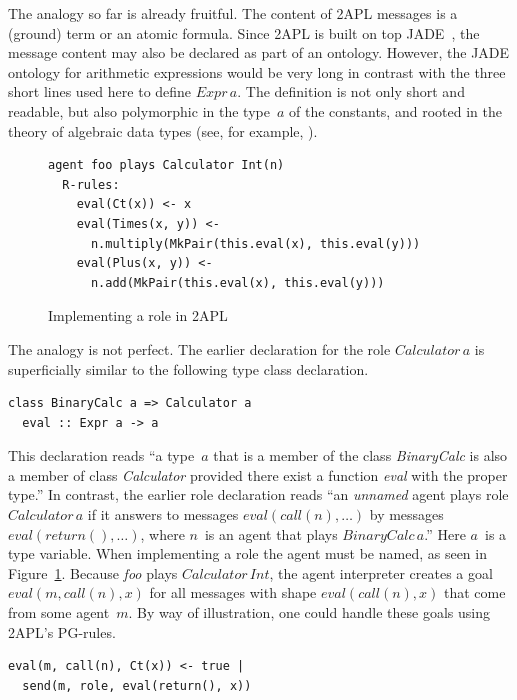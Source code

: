 \documentclass[a4paper,12pt,oneside,fleqn]{book} %
\begin{document}
The analogy so far is already fruitful. The content of 2APL messages is a
(ground) term or an atomic formula. Since 2APL is built on top
JADE~\cite{DBLP:books/sp/map2005/BellifemineBCP05}, the message content may
also be declared as part of an ontology. However, the JADE ontology for
arithmetic expressions would be very long in contrast with the three short
lines used here to define $\mathit{Expr}\,a$. The definition is not only
short and readable, but also polymorphic in the type~$a$ of the constants,
and rooted in the theory of algebraic data types (see, for example,
\cite{DBLP:conf/ctcs/Hagino87}).

\begin{figure}\footnotesize %
\begin{verbatim}
agent foo plays Calculator Int(n)
  R-rules:
    eval(Ct(x)) <- x
    eval(Times(x, y)) <-
      n.multiply(MkPair(this.eval(x), this.eval(y)))
    eval(Plus(x, y)) <-
      n.add(MkPair(this.eval(x), this.eval(y)))
\end{verbatim}
\caption{Implementing a role in 2APL}\label{fig:roleimpl2APL}
\end{figure} %

The analogy is not perfect. The earlier declaration for the role
$\mathit{Calculator}\,a$ is superficially similar to the following type
class declaration.
\begin{verbatim}
class BinaryCalc a => Calculator a
  eval :: Expr a -> a
\end{verbatim}

This declaration reads ``a type~$a$ that is a member of the class
\textit{BinaryCalc} is also a member of class \textit{Calculator} provided
there exist a function \textit{eval} with the proper type.'' In contrast,
the earlier role declaration reads ``an \emph{unnamed} agent plays role
$\mathit{Calculator}\,a$ if it answers to messages
$\mathit{eval}(\mathit{call}(n),\ldots)$ by messages
$\mathit{eval}(\mathit{return}(),\ldots)$, where $n$~is an agent that plays
$\mathit{BinaryCalc}\,a$.'' Here $a$~is a type variable.  When implementing
a role the agent must be named, as seen in Figure~\ref{fig:roleimpl2APL}.
Because \textit{foo} plays $\mathit{Calculator}\,\mathit{Int}$, the agent
interpreter creates a goal $\mathit{eval}(m,\mathit{call}(n),x)$ for all
messages with shape $\mathit{eval}(\mathit{call}(n),x)$ that come from some
agent~$m$. By way of illustration, one could handle these goals using 2APL's PG-rules.

\begin{verbatim}
eval(m, call(n), Ct(x)) <- true |
  send(m, role, eval(return(), x))
\end{verbatim}
\end{document}
